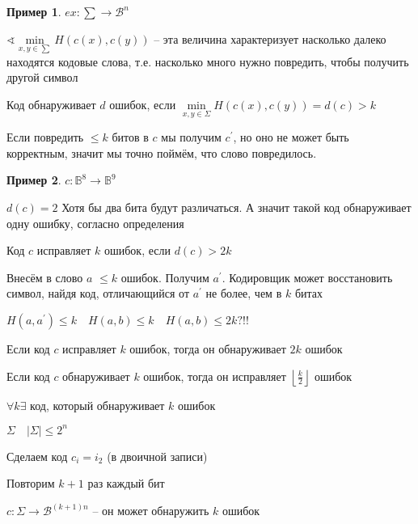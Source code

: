 \documentclass{book}
\newcommand{\p}[1]{#1^{\prime}}
\theoremstyle{definition}
\newtheorem*{example}{Пример}
\begin{document}
\begin{example}
    $ex:\sum \to  \mathscr{B}^n$

    $\sphericalangle \min\limits_{x, y\in \sum}H(c(x), c(y))$ -- эта величина характеризует насколько далеко находятся кодовые слова, т.е. насколько много нужно повредить, чтобы получить другой символ
\end{example}

\begin{definition}
    Код обнаруживает $d$ ошибок, если  $\min\limits_{x, y\in \Sigma} H(c(x), c(y)) = d(c) > k$

    Если повредить  $\leqslant k$ битов в $c$ мы получим  $\p c$, но оно не может быть корректным, значит мы точно поймём, что слово повредилось.
\end{definition}

\begin{example}
    $c:\mathbb{B}^8 \to \mathbb{B}^9$

    $d(c) = 2$ Хотя бы два бита будут различаться. А значит такой код обнаруживает одну ошибку, согласно определения
\end{example}

\begin{definition}
    Код $c$ исправляет  $k$ ошибок, если  $d(c)>2k$

    Внесём в слово  $a$  $\leqslant k$ ошибок. Получим $\p a$. Кодировщик может восстановить символ, найдя код, отличающийся от  $\p a$ не более, чем в $k$ битах

    $H(a,\p a)\leqslant k\quad H(a, b)\leqslant k\quad H(a, b)\leqslant 2k ?!! $
\end{definition}

\begin{statement}
    Если код $c$ исправляет  $k$ ошибок, тогда он обнаруживает  $2k$ ошибок
\end{statement}

\begin{statement}
    Если код $c$ обнаруживает   $k$ ошибок, тогда он исправляет  $\left\lfloor \frac{k}{2} \right\rfloor$ ошибок
\end{statement}

\begin{statement}
    $\forall k\exists $ код, который обнаруживает $k$ ошибок

     $\Sigma\quad \left| \Sigma \right| \leqslant 2^n $

     Сделаем код $c_i = i_2$ (в двоичной записи)

     Повторим  $k+1$ раз каждый бит

     $c:\Sigma \to \mathscr{B}^{(k+1)n}$ -- он может обнаружить $k$ ошибок 
\end{statement}
\end{document}

